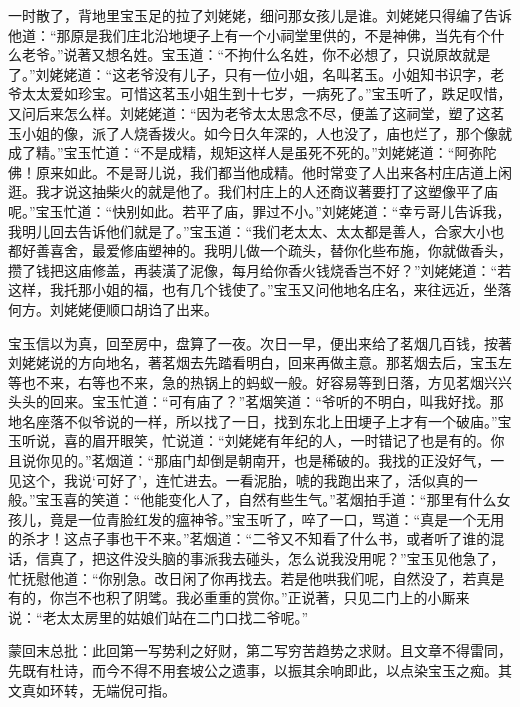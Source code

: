 \begin{parag}
    一时散了，背地里宝玉足的拉了刘姥姥，细问那女孩儿是谁。刘姥姥只得编了告诉他道：“那原是我们庄北沿地埂子上有一个小祠堂里供的，不是神佛，当先有个什么老爷。”说著又想名姓。宝玉道：“不拘什么名姓，你不必想了，只说原故就是了。”刘姥姥道：“这老爷没有儿子，只有一位小姐，名叫茗玉。小姐知书识字，老爷太太爱如珍宝。可惜这茗玉小姐生到十七岁，一病死了。”宝玉听了，跌足叹惜，又问后来怎么样。刘姥姥道：“因为老爷太太思念不尽，便盖了这祠堂，塑了这茗玉小姐的像，派了人烧香拨火。如今日久年深的，人也没了，庙也烂了，那个像就成了精。”宝玉忙道：“不是成精，规矩这样人是虽死不死的。”刘姥姥道：“阿弥陀佛！原来如此。不是哥儿说，我们都当他成精。他时常变了人出来各村庄店道上闲逛。我才说这抽柴火的就是他了。我们村庄上的人还商议著要打了这塑像平了庙呢。”宝玉忙道：“快别如此。若平了庙，罪过不小。”刘姥姥道：“幸亏哥儿告诉我，我明儿回去告诉他们就是了。”宝玉道：“我们老太太、太太都是善人，合家大小也都好善喜舍，最爱修庙塑神的。我明儿做一个疏头，替你化些布施，你就做香头，攒了钱把这庙修盖，再装潢了泥像，每月给你香火钱烧香岂不好？”刘姥姥道：“若这样，我托那小姐的福，也有几个钱使了。”宝玉又问他地名庄名，来往远近，坐落何方。刘姥姥便顺口胡诌了出来。
\end{parag}


\begin{parag}
    宝玉信以为真，回至房中，盘算了一夜。次日一早，便出来给了茗烟几百钱，按著刘姥姥说的方向地名，著茗烟去先踏看明白，回来再做主意。那茗烟去后，宝玉左等也不来，右等也不来，急的热锅上的蚂蚁一般。好容易等到日落，方见茗烟兴兴头头的回来。宝玉忙道：“可有庙了？”茗烟笑道：“爷听的不明白，叫我好找。那地名座落不似爷说的一样，所以找了一日，找到东北上田埂子上才有一个破庙。”宝玉听说，喜的眉开眼笑，忙说道：“刘姥姥有年纪的人，一时错记了也是有的。你且说你见的。”茗烟道：“那庙门却倒是朝南开，也是稀破的。我找的正没好气，一见这个，我说‘可好了’，连忙进去。一看泥胎，唬的我跑出来了，活似真的一般。”宝玉喜的笑道：“他能变化人了，自然有些生气。”茗烟拍手道：“那里有什么女孩儿，竟是一位青脸红发的瘟神爷。”宝玉听了，啐了一口，骂道：“真是一个无用的杀才！这点子事也干不来。”茗烟道：“二爷又不知看了什么书，或者听了谁的混话，信真了，把这件没头脑的事派我去碰头，怎么说我没用呢？”宝玉见他急了，忙抚慰他道：“你别急。改日闲了你再找去。若是他哄我们呢，自然没了，若真是有的，你岂不也积了阴骘。我必重重的赏你。”正说著，只见二门上的小厮来说：“老太太房里的姑娘们站在二门口找二爷呢。”
\end{parag}


\begin{parag}
    \begin{note}蒙回末总批：此回第一写势利之好财，第二写穷苦趋势之求财。且文章不得雷同，先既有杜诗，而今不得不用套坡公之遗事，以振其余响即此，以点染宝玉之痴。其文真如环转，无端倪可指。\end{note}
\end{parag}

